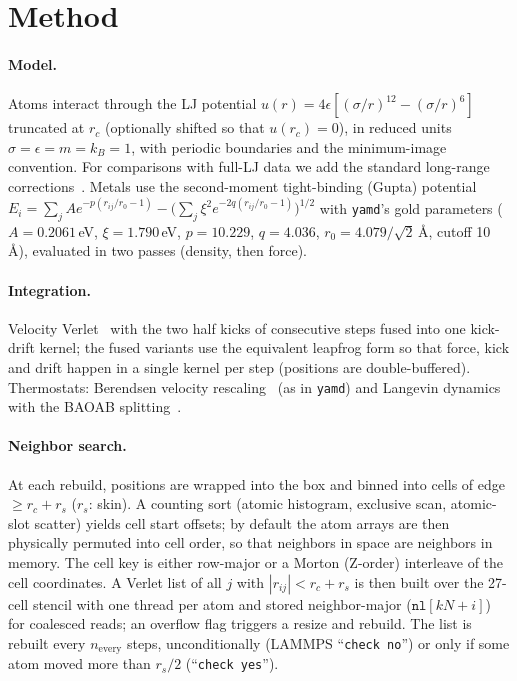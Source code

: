\documentclass[11pt]{article}
\newcommand{\yamd}{\texttt{yamd}}
\begin{document}
\section{Method}\label{sec:method}
\paragraph{Model.} Atoms interact through the LJ potential
$u(r)=4\epsilon[(\sigma/r)^{12}-(\sigma/r)^6]$ truncated at $r_c$ (optionally shifted so that
$u(r_c)=0$), in reduced units $\sigma=\epsilon=m=k_B=1$, with periodic boundaries and the
minimum-image convention. For comparisons with full-LJ data we add the standard long-range
corrections~\cite{allen2017}. Metals use the second-moment tight-binding (Gupta) potential
$E_i=\sum_j A e^{-p(r_{ij}/r_0-1)}-\big(\sum_j\xi^2e^{-2q(r_{ij}/r_0-1)}\big)^{1/2}$
\cite{ducastelle1970,gupta1981,cleri1993} with \yamd's gold parameters ($A=0.2061$\,eV,
$\xi=1.790$\,eV, $p=10.229$, $q=4.036$, $r_0=4.079/\sqrt2$\,\AA, cutoff 10\,\AA), evaluated in two
passes (density, then force).

\paragraph{Integration.} Velocity Verlet~\cite{swope1982} with the two half kicks of
consecutive steps fused into one kick-drift kernel; the fused variants use the equivalent
leapfrog form so that force, kick and drift happen in a single kernel per step (positions are
double-buffered). Thermostats: Berendsen velocity rescaling~\cite{berendsen1984} (as in
\yamd) and Langevin dynamics with the BAOAB splitting~\cite{leimkuhler2013}.

\paragraph{Neighbor search.} At each rebuild, positions are wrapped into the box and binned
into cells of edge $\ge r_c+r_s$ ($r_s$: skin). A counting sort (atomic histogram, exclusive
scan, atomic-slot scatter) yields cell start offsets; by default the atom arrays are then
physically permuted into cell order, so that neighbors in space are neighbors in memory. The
cell key is either row-major or a Morton (Z-order) interleave of the cell coordinates. A
Verlet list of all $j$ with $|r_{ij}|<r_c+r_s$ is then built over the 27-cell stencil with one
thread per atom and stored neighbor-major ($\texttt{nl}[k N+i]$) for coalesced reads; an
overflow flag triggers a resize and rebuild. The list is rebuilt every $n_{\mathrm{every}}$
steps, unconditionally (LAMMPS ``\texttt{check no}'') or only if some atom moved more than
$r_s/2$ (``\texttt{check yes}'').
\end{document}
